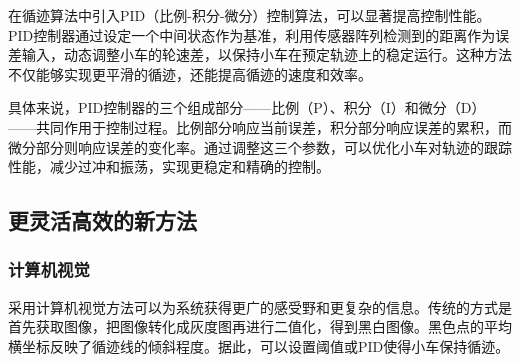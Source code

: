\documentclass{report}
\begin{document}
在循迹算法中引入PID（比例-积分-微分）控制算法，可以显著提高控制性能。PID控制器通过设定一个中间状态作为基准，利用传感器阵列检测到的距离作为误差输入，动态调整小车的轮速差，以保持小车在预定轨迹上的稳定运行。这种方法不仅能够实现更平滑的循迹，还能提高循迹的速度和效率。

具体来说，PID控制器的三个组成部分——比例（P）、积分（I）和微分（D）——共同作用于控制过程。比例部分响应当前误差，积分部分响应误差的累积，而微分部分则响应误差的变化率。通过调整这三个参数，可以优化小车对轨迹的跟踪性能，减少过冲和振荡，实现更稳定和精确的控制。


\subsection{更灵活高效的新方法}
\label{subsec:label}
\subsubsection{计算机视觉\cite{opencv}}
\label{subsec:label}
采用计算机视觉方法可以为系统获得更广的感受野和更复杂的信息。传统的方式是首先获取图像，把图像转化成灰度图再进行二值化，得到黑白图像。黑色点的平均横坐标反映了循迹线的倾斜程度。据此，可以设置阈值或PID使得小车保持循迹。
\end{document}
